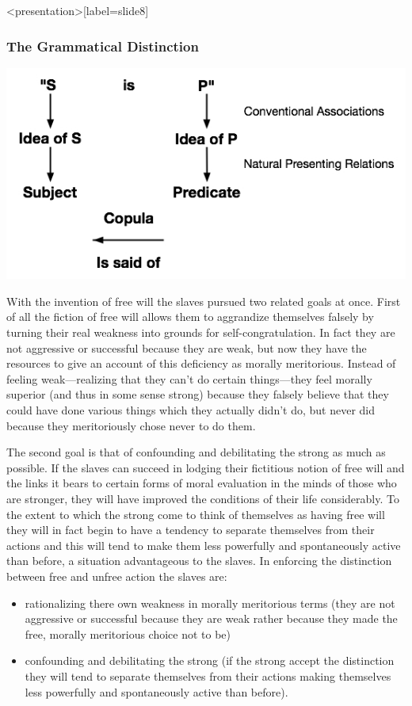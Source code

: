 \begin{frame}<presentation>[label=slide8]
    \frametitle{The Grammatical Distinction}
        \includegraphics[width=\textwidth]{../../../graphics/subject_predicate.jpg}
\end{frame}

With the invention of free will the slaves pursued two related goals at once. First of all the fiction of free will allows them to aggrandize themselves falsely by turning their real weakness into grounds for self-congratulation. In fact they are not aggressive or successful because they are weak, but now they have the resources to give an account of this deficiency as morally meritorious. Instead of feeling weak---realizing that they can't do certain things---they feel morally superior (and thus in some sense strong) because they falsely believe that they could have done various things which they actually didn't do, but never did because they meritoriously chose never to do them.

The second goal is that of confounding and debilitating the strong as much as possible. If the slaves can succeed in lodging their fictitious notion of free will and the links it bears to certain forms of moral evaluation in the minds of those who are stronger, they will have improved the conditions of their life considerably. To the extent to which the strong come to think of themselves as having free will they will in fact begin to have a tendency to separate themselves from their actions and this will tend to make them less powerfully and spontaneously active than before, a situation advantageous to the slaves. In enforcing the distinction between free and unfree action the slaves are: 
\begin{itemize}
    \item rationalizing there own weakness in morally meritorious terms (they are not aggressive or successful because they are weak rather because they made the free, morally meritorious choice not to be)
    \item confounding and debilitating the strong (if the strong accept the distinction they will tend to separate themselves from their actions making themselves less powerfully and spontaneously active than before).
\end{itemize}

